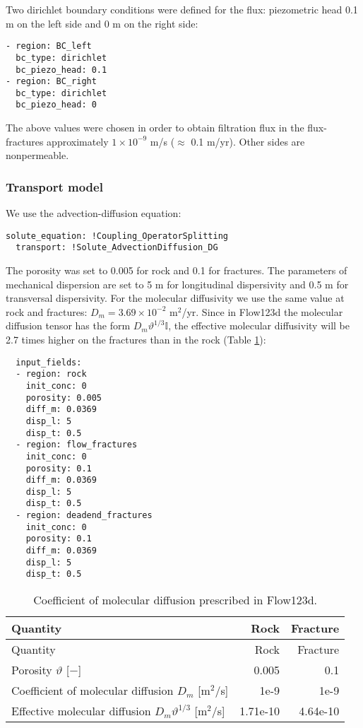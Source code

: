 Two dirichlet boundary conditions were defined for the flux: piezometric
head 0.1 m on the left side and 0 m on the right side:

\begin{verbatim}
- region: BC_left
  bc_type: dirichlet
  bc_piezo_head: 0.1
- region: BC_right
  bc_type: dirichlet
  bc_piezo_head: 0
\end{verbatim}

The above values were chosen in order to obtain filtration flux in the
flux-fractures approximately \(1 \times 10^{-9}\) m/s (\(\approx\) 0.1
m/yr). Other sides are nonpermeable.

\subsubsection{Transport model}

We use the advection-diffusion equation:

\begin{verbatim}
solute_equation: !Coupling_OperatorSplitting
  transport: !Solute_AdvectionDiffusion_DG
\end{verbatim}

The porosity was set to 0.005 for rock and 0.1 for fractures. The
parameters of mechanical dispersion are set to 5 m for longitudinal
dispersivity and 0.5 m for transversal dispersivity. For the molecular
diffusivity we use the same value at rock and fractures:
\(D_m = 3.69 \times 10^{-2}\) m\(^2\)/yr. Since in Flow123d the
molecular diffusion tensor has the form \(D_m\vartheta^{1/3}\mathbb I\),
the effective molecular diffusivity will be 2.7 times higher on the
fractures than in the rock (Table \ref{tbl:coefDiff}):

\begin{verbatim}
  input_fields:
  - region: rock
    init_conc: 0
    porosity: 0.005
    diff_m: 0.0369
    disp_l: 5
    disp_t: 0.5
  - region: flow_fractures
    init_conc: 0
    porosity: 0.1
    diff_m: 0.0369
    disp_l: 5
    disp_t: 0.5
  - region: deadend_fractures
    init_conc: 0
    porosity: 0.1
    diff_m: 0.0369
    disp_l: 5
    disp_t: 0.5
\end{verbatim}

\begin{longtable}[]{@{}lrr@{}}
\caption{Coefficient of molecular diffusion prescribed in Flow123d.
\label{tbl:coefDiff}}\tabularnewline
\toprule
Quantity & Rock & Fracture\tabularnewline
\midrule
\endfirsthead
\toprule
Quantity & Rock & Fracture\tabularnewline
\midrule
\endhead
Porosity \(\vartheta\) {[}\(-\){]} & 0.005 & 0.1\tabularnewline
Coefficient of molecular diffusion \(D_m\) {[}m\(^2\)/s{]} & 1e-9 &
1e-9\tabularnewline
Effective molecular diffusion \(D_m\vartheta^{1/3}\) {[}m\(^2\)/s{]} &
1.71e-10 & 4.64e-10\tabularnewline
\bottomrule
\end{longtable}

